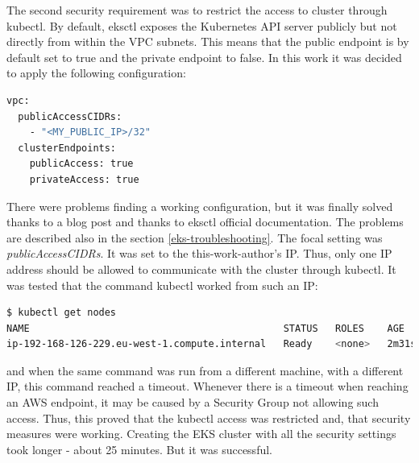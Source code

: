 The second security requirement was to restrict the access to cluster through kubectl. By default, eksctl exposes the Kubernetes API server publicly but not directly from within the VPC subnets. This means that the public endpoint is by default set to true and the private endpoint to false\cite{eksctl-net}. In this work it was decided to apply the following configuration:
\begin{lstlisting}[basicstyle=\tiny,caption={Eksctl configuration applying security measures},captionpos=b,language=Bash,xleftmargin=1cm]
vpc:
  publicAccessCIDRs:
    - "<MY_PUBLIC_IP>/32"
  clusterEndpoints:
    publicAccess: true
    privateAccess: true
\end{lstlisting}
There were problems finding a working configuration, but it was finally solved thanks to a blog post\cite{eksctl-net-issue-solution} and thanks to eksctl official documentation\cite{eksctl-net}. The problems are described also in the section \ref{eks-troubleshooting}. The focal setting was \textit{publicAccessCIDRs}. It was set to the this-work-author's IP. Thus, only one IP address should be allowed to communicate with the cluster through kubectl. It was tested that the command kubectl worked from such an IP:
\begin{lstlisting}[basicstyle=\tiny,caption={Verifying connection to API server},captionpos=b,language=Bash,xleftmargin=1cm]
$ kubectl get nodes
NAME                                            STATUS   ROLES    AGE     VERSION
ip-192-168-126-229.eu-west-1.compute.internal   Ready    <none>   2m31s   v1.16.8-eks-e16311
\end{lstlisting}
and when the same command was run from a different machine, with a different IP, this command reached a timeout. Whenever there is a timeout when reaching an AWS endpoint, it may be caused by a Security Group not allowing such access. Thus, this proved that the kubectl access was restricted and, that security measures were working. Creating the EKS cluster with all the security settings took longer - about 25 minutes. But it was successful.

